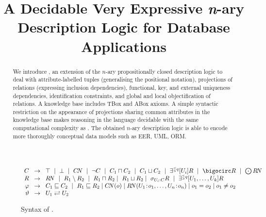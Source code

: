 \documentclass[draft]{article}
\title{A Decidable Very Expressive \textit{n}-ary Description Logic for Database Applications}
\newcommand{\greif}[1]{\ensuremath{\bigocirc#1}}
\newcommand{\lreif}[1]{\ensuremath{\bigodot#1}}
\begin{document}
\date{}
\maketitle


\begin{abstract}
We introduce \DLRp{}\negmedspace, an extension of the $n$-ary propositionally closed description logic \DLR to deal with attribute-labelled tuples (generalising the positional notation), projections of relations (expressing inclusion dependencies), functional, key, and external uniqueness dependencies, identification constraints, and global and local objectification of relations. A \DLRp knowledge base includes TBox and ABox axioms. A simple syntactic restriction on the appearance of projections sharing common attributes in the knowledge base makes reasoning in the language decidable with the same computational complexity as \DLR. 
The obtained \DLRpm $n$-ary description logic is able to encode more thoroughly conceptual data models such as EER, UML, ORM.
\end{abstract}


\begin{figure*}
	[t] 
	\centering
		\renewcommand{\arraystretch}{1.1} 
		$
		\begin{array}{r@{\hspace{2ex}}c@{\hspace{2ex}}l} 
			C & \to & \top\ \mid\ \bot\ \mid\ C\!N\ \mid\ \neg C\ \mid\ C_{1}\sqcap C_{2}\ \mid\ C_{1}\sqcup C_{2}\ \mid\ \EXISTR{q}{U_i} R\ \mid\ \greif{R}\ \mid\ \lreif{R\!N}\\
			R & \to & R\!N\ \mid\ R_1\setminus R_2\ \mid\ R_{1}\sqcap R_{2}\mid\ R_{1}\sqcup R_{2}\mid\ \selects{U_i}{C}{R}\ \mid\ \EXISTR{q}{U_1,\ldots,U_k} R\\
			\varphi & \to & C_1\sqsubseteq C_2\ \mid\ R_1\sqsubseteq R_2 \mid C\!N(o) \mid R\!N(U_1\!:\!o_1,\ldots,U_n\!:\!o_n) \mid o_1 = o_2 \mid o_1 \neq o_2 \\
			\vartheta & \to & U_1 \rightleftarrows U_2
		\end{array}
		$ 
		\vspace*{-2ex}
		\renewcommand{\arraystretch}{1} 
	\caption{\label{fig:dlrp} Syntax of \DLRp.} 
\end{figure*}
\end{document}

